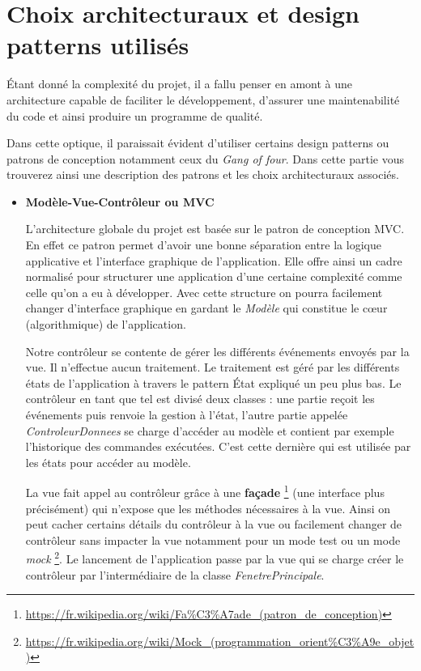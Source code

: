 \documentclass[10pt,a4paper]{book}
\begin{document}
\section{Choix architecturaux et design patterns utilisés}
Étant donné la complexité du projet, il a fallu penser en amont à une architecture capable de faciliter le développement, d'assurer une maintenabilité du code et ainsi produire un programme de qualité. 

Dans cette optique, il paraissait évident d'utiliser certains design patterns ou patrons de conception notamment ceux du \textit{Gang of four}. Dans cette partie vous trouverez ainsi une description des patrons et les choix architecturaux associés.
\begin{itemize}

\item \textbf{Modèle-Vue-Contrôleur ou MVC}

L'architecture globale du projet est basée sur le patron de conception MVC. En effet ce patron permet d'avoir une bonne séparation entre la logique applicative et l'interface graphique de l'application. Elle offre ainsi un cadre normalisé pour structurer une application d'une certaine complexité comme celle qu'on a eu à développer. Avec cette structure on pourra facilement changer d'interface graphique en gardant le \textit{Modèle} qui constitue le cœur (algorithmique) de l'application.

Notre contrôleur se contente de gérer les différents événements envoyés par la vue. Il n'effectue aucun traitement. Le traitement est géré par les différents états de l'application à travers le pattern État expliqué un peu plus bas. Le contrôleur en tant que tel est divisé deux classes : une partie reçoit les événements puis renvoie la gestion à l'état, l'autre partie appelée \textit{ControleurDonnees} se charge d’accéder au modèle et contient par exemple l'historique des commandes exécutées. C'est cette dernière qui est utilisée par les états pour accéder au modèle.

La vue fait appel au contrôleur grâce à une \textbf{façade} \footnote{\url{https://fr.wikipedia.org/wiki/Fa\%C3\%A7ade\_(patron\_de\_conception)}} (une interface plus précisément) qui n'expose que les méthodes nécessaires à la vue. Ainsi on peut cacher certains détails du contrôleur à la vue ou facilement changer de contrôleur sans impacter la vue notamment pour un mode test ou un mode \textit{mock} \footnote{\url{https://fr.wikipedia.org/wiki/Mock\_(programmation\_orient\%C3\%A9e\_objet)}}.
Le lancement de l'application passe par la vue qui se charge créer le contrôleur par l’intermédiaire de la classe \textit{FenetrePrincipale}.


\end{itemize}
\end{document}
